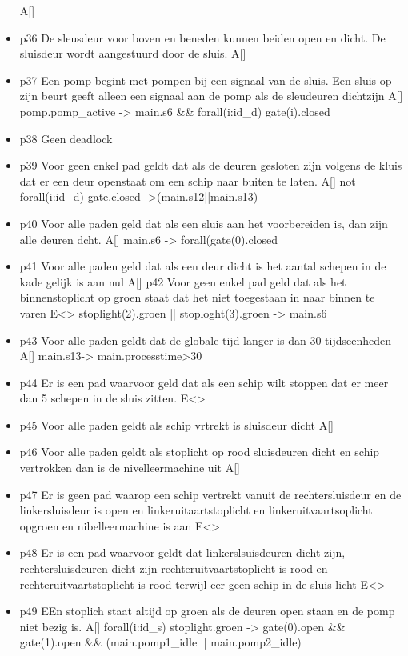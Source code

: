 \begin{itemize}
  A[]
\item  p36 De sleusdeur voor boven en beneden kunnen beiden open en dicht. De sluisdeur wordt aangestuurd door de sluis. 
  A[]
\item  p37 Een pomp begint met pompen bij een signaal van de sluis. Een sluis op zijn beurt geeft alleen een signaal aan de pomp als de sleudeuren dichtzijn
  A[] pomp.pomp_active -> main.s6 && forall(i:id_d) gate(i).closed
\item  p38 Geen deadlock
\item  p39 Voor geen enkel pad geldt dat als  de deuren gesloten zijn volgens de kluis dat er een deur openstaat om een schip naar buiten te laten.
 A[] not forall(i:id_d) gate.closed ->(main.s12||main.s13)
\item  p40 Voor alle paden geld dat als een sluis aan het voorbereiden is, dan zijn alle deuren dcht.
 A[] main.s6 -> forall(gate(0).closed
\item   p41 Voor alle paden geld dat als een deur dicht is het aantal schepen in de kade gelijk is aan nul	
 A[]
 p42 Voor geen enkel pad geld dat als het binnenstoplicht op groen staat dat het niet toegestaan in naar binnen te varen
 E<> stoplight(2).groen || stoploght(3).groen -> main.s6
\item  p43 Voor alle paden geldt dat de globale tijd langer is dan 30 tijdseenheden
 A[] main.s13-> main.processtime>30
\item  p44 Er is een pad waarvoor geld dat als een schip wilt stoppen dat er meer dan 5 schepen in de sluis zitten.
 E<>
 \item p45 Voor alle paden geldt als schip vrtrekt is sluisdeur dicht
 A[] 
\item  p46 Voor alle paden geldt als stoplicht op rood sluisdeuren dicht en schip vertrokken dan is de nivelleermachine uit
 A[]
\item  p47 Er is geen pad waarop een schip vertrekt vanuit de rechtersluisdeur en de linkersluisdeur is open en linkeruitaartstoplicht en linkeruitvaartsoplicht opgroen  en nibelleermachine is aan
 E<>
\item  p48 Er is een pad waarvoor geldt dat linkerslsuisdeuren dicht zijn, rechtersluisdeuren dicht zijn rechteruitvaartstoplicht is rood en rechteruitvaartstoplicht is  rood terwijl eer geen schip in de sluis licht
 E<> 
\item  p49 EEn stoplich staat altijd op groen als de deuren open staan en de pomp niet bezig is.
 A[] forall(i:id_s) stoplight.groen -> gate(0).open && gate(1).open && (main.pomp1_idle || main.pomp2_idle)

\end{itemize}
